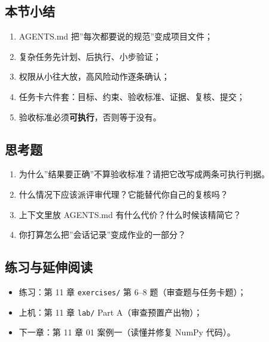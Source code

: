 \subsection{本节小结}\label{ux672cux8282ux5c0fux7ed3-5}

\begin{enumerate}
\def\labelenumi{\arabic{enumi}.}
\tightlist
\item
  AGENTS.md 把''每次都要说的规范''变成项目文件；
\item
  复杂任务先计划、后执行、小步验证；
\item
  权限从小往大放，高风险动作逐条确认；
\item
  任务卡六件套：目标、约束、验收标准、证据、复核、提交；
\item
  验收标准必须\textbf{可执行}，否则等于没有。
\end{enumerate}

\subsection{思考题}\label{ux601dux8003ux9898-29}

\begin{enumerate}
\def\labelenumi{\arabic{enumi}.}
\tightlist
\item
  为什么''结果要正确''不算验收标准？请把它改写成两条可执行判据。
\item
  什么情况下应该派评审代理？它能替代你自己的复核吗？
\item
  上下文里放 AGENTS.md 有什么代价？什么时候该精简它？
\item
  你打算怎么把''会话记录''变成作业的一部分？
\end{enumerate}

\subsection{练习与延伸阅读}\label{ux7ec3ux4e60ux4e0eux5ef6ux4f38ux9605ux8bfb-2}

\begin{itemize}
\tightlist
\item
  练习：第 11 章 \texttt{exercises/} 第 6--8 题（审查题与任务卡题）；
\item
  上机：第 11 章 \texttt{lab/} Part A（审查预置产出物）；
\item
  下一章：第 11 章 01 案例一（读懂并修复 NumPy 代码）。
\end{itemize}

\newpage
